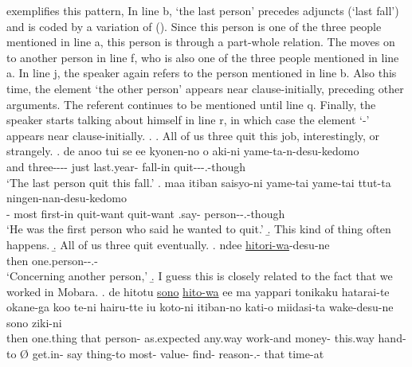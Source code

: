 \Next exemplifies this pattern,
In line b,  `the last person' precedes adjuncts (`last fall') and is coded by a variation of  ().
Since this person is one of the three people mentioned in line a,
this person is 
through a part-whole relation.
The  moves on to another person in line f, who is also one of the three people mentioned in line a.
In line j, the speaker again refers to the person mentioned in line b.
Also this time, the element  `the other person' appears near clause-initially, preceding other arguments.
The referent continues to be mentioned until line q.
Finally, the speaker starts talking about himself in line r,
in which case the element  `-' appears near clause-initially.
%
\ex.
 \a. All of us three quit this job, interestingly, or strangely.
 \bg. de anoo  tui se ee kyonen-no o aki-ni yame-ta-n-desu-kedomo \\
 	and  three---- just   last.year-  fall-in quit---.-though \\
	`The last person quit this fall.'
 \bg.  maa itiban saisyo-ni yame-tai yame-tai ttut-ta ningen-nan-desu-kedomo \\
 		-  most first-in quit-want quit-want .say- person--.-though \\
		`He was the first person who said he wanted to quit.'
 \b. This kind of thing often happens.
 \b. All of us three quit eventually.
 \bg. ndee \ul{hitori-wa}-desu-ne \\
 		then one.person--.- \\
		`Concerning another person,'
 \b. I guess this is closely related to the fact that we worked in Mobara.
 \bg. de hitotu \ul{sono} \ul{hito-wa} ee ma yappari tonikaku hatarai-te okane-ga koo te-ni \EM{\O} hairu-tte iu koto-ni itiban-no kati-o miidasi-ta wake-desu-ne sono ziki-ni \\
 		then one.thing that person- \ab{fl}  as.expected any.way work-and money- this.way hand-to {\O} get.in- say thing-to most- value- find- reason-.- that time-at \\
